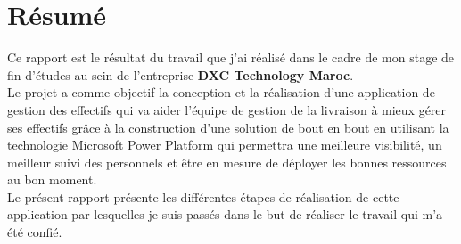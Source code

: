 \chapter*{\vspace{1.2in} Résumé }
\vspace{0.5in}

Ce rapport est le résultat du travail que j'ai réalisé dans le cadre de mon stage de fin d'études au sein de l'entreprise \textbf{DXC Technology Maroc}.\\

Le projet a comme objectif la conception et la réalisation d'une application de gestion des effectifs qui va aider l'équipe de gestion de la livraison à mieux gérer ses effectifs grâce à la construction d'une solution de bout en bout en utilisant la technologie Microsoft Power Platform qui permettra une meilleure visibilité, un meilleur suivi des personnels et être en mesure de déployer les bonnes ressources au bon moment.\\ 

Le présent rapport présente les différentes étapes de réalisation de cette application par lesquelles je suis passés dans le but de réaliser le travail qui m'a été confié. 